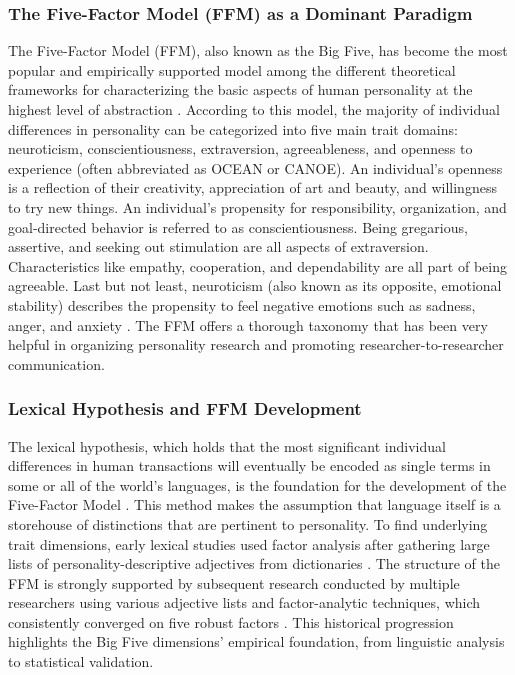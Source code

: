 \documentclass{DESSThesis}
\begin{document}
\subsubsection{The Five-Factor Model (FFM) as a Dominant Paradigm}
The Five-Factor Model (FFM), also known as the Big Five, has become the most popular and empirically supported model among the different theoretical frameworks for characterizing the basic aspects of human personality at the highest level of abstraction \cite{feng_five-factor_2024,cobb-clark_stability_2012,okeefe_introducing_2012,rammstedt_big_2014}. According to this model, the majority of individual differences in personality can be categorized into five main trait domains: neuroticism, conscientiousness, extraversion, agreeableness, and openness to experience (often abbreviated as OCEAN or CANOE). An individual's openness is a reflection of their creativity, appreciation of art and beauty, and willingness to try new things. An individual's propensity for responsibility, organization, and goal-directed behavior is referred to as conscientiousness. Being gregarious, assertive, and seeking out stimulation are all aspects of extraversion. Characteristics like empathy, cooperation, and dependability are all part of being agreeable. Last but not least, neuroticism (also known as its opposite, emotional stability) describes the propensity to feel negative emotions such as sadness, anger, and anxiety \cite{feng_five-factor_2024,okeefe_introducing_2012}. The FFM offers a thorough taxonomy that has been very helpful in organizing personality research and promoting researcher-to-researcher communication.

\subsubsection{Lexical Hypothesis and FFM Development}
The lexical hypothesis, which holds that the most significant individual differences in human transactions will eventually be encoded as single terms in some or all of the world's languages, is the foundation for the development of the Five-Factor Model \cite{feng_five-factor_2024,rammstedt_big_2014}. This method makes the assumption that language itself is a storehouse of distinctions that are pertinent to personality. To find underlying trait dimensions, early lexical studies used factor analysis after gathering large lists of personality-descriptive adjectives from dictionaries \cite{feng_five-factor_2024,rammstedt_big_2014}. The structure of the FFM is strongly supported by subsequent research conducted by multiple researchers using various adjective lists and factor-analytic techniques, which consistently converged on five robust factors \cite{feng_five-factor_2024}. This historical progression highlights the Big Five dimensions' empirical foundation, from linguistic analysis to statistical validation.
\end{document}
